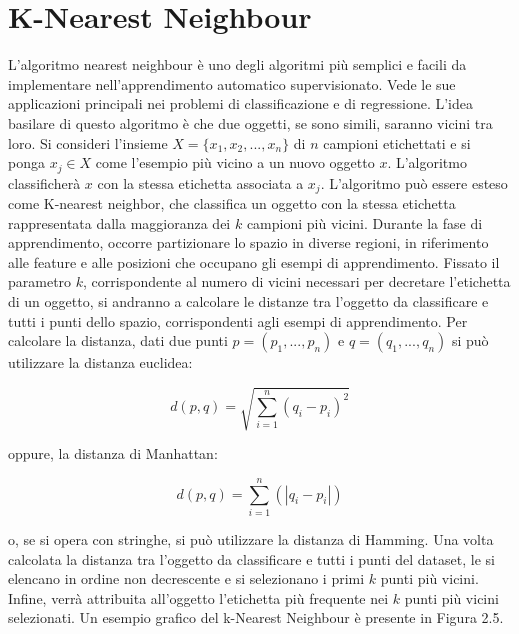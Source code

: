 \documentclass[11pt,  oneside, openany]{book}
\begin{document}
\section{ K-Nearest Neighbour}	
L'algoritmo nearest neighbour è uno degli algoritmi più semplici e facili da implementare nell'apprendimento automatico supervisionato. Vede le sue applicazioni principali nei problemi di classificazione e di regressione. L'idea basilare di questo algoritmo è che due oggetti, se sono simili, saranno vicini tra loro. Si consideri l'insieme $X=\{x_1, x_2, ..., x_n\}$ di $n$ campioni etichettati e si ponga $x_j \in X$ come l'esempio più vicino a un nuovo oggetto $x$. L'algoritmo classificherà $x$ con la stessa etichetta associata a $x_j$. L'algoritmo può essere esteso come  K-nearest neighbor, che classifica un oggetto con la stessa etichetta rappresentata dalla maggioranza dei $k$ campioni più vicini. Durante la fase di apprendimento, occorre partizionare lo spazio in diverse regioni, in riferimento alle feature e alle posizioni che occupano gli esempi di apprendimento. Fissato il parametro $k$, corrispondente al numero di vicini necessari per decretare l'etichetta di un oggetto, si andranno a calcolare le distanze tra l'oggetto da classificare e tutti i punti dello spazio, corrispondenti agli esempi di apprendimento. Per calcolare la distanza, dati due punti $ p = (p_1, ..., p_n)$ e $q =  (q_1, ..., q_n)$ si può utilizzare la distanza euclidea:

$$d\left( p,q\right)   = \sqrt {\sum _{i=1}^{n}  \left( q_{i}-p_{i}\right)^2 }$$

\noindent oppure, la distanza di Manhattan: 


$$  d\left( p,q\right) = \sum _{i=1}^{n} \left(|q_{i}-p_{i}|\right)$$


\noindent o, se si opera con stringhe, si può utilizzare la distanza di Hamming. 
Una volta calcolata la distanza tra l'oggetto da classificare e tutti i punti del dataset, le si elencano in ordine non decrescente e si selezionano i primi $k$ punti più vicini. Infine, verrà attribuita all'oggetto l'etichetta più frequente nei $k$ punti più vicini selezionati. 
Un esempio grafico del k-Nearest Neighbour è presente in Figura 2.5. 
\end{document}
